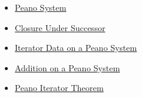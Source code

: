 \begin{dependencies}
\begin{itemize}
  \item \hyperref[def:peano-system]{Peano System}
  \item \hyperref[ax:peano-successor-closure]{Closure Under Successor}
  \item \hyperref[def:iterator-data-on-peano-system]{Iterator Data on a Peano System}
  \item \hyperref[def:addition-on-peano-system]{Addition on a Peano System}
  \item \hyperref[thm:peano-iterator-theorem]{Peano Iterator Theorem}
\end{itemize}
\end{dependencies}

\clearpage
